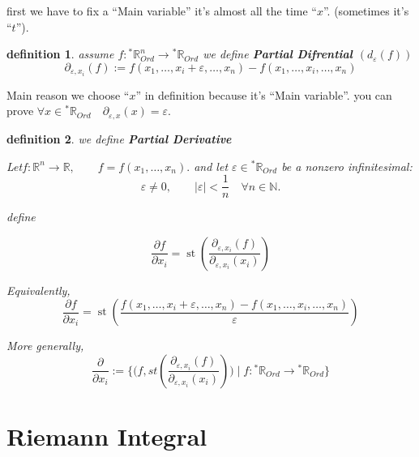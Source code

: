 \documentclass[10pt,a4paper]{book}
\newtheorem{definition}{definition}[section]
\begin{document}
first we have to fix a ``Main variable'' it's almost all the time ``$x$''.
(sometimes it's ``$t$'').
\begin{definition} assume $f : {}^*\mathbb{R}_{Ord}^n  \to {}^*\mathbb{R}_{Ord}$
    we define \textbf{Partial Difrential $(d_\varepsilon(f))$}
    \[ \partial_{\varepsilon , x_i } (f) := f(x_1,\ldots,x_i+ \varepsilon ,\ldots,x_n) - f(x_1,\ldots,x_i,\ldots,x_n) \]
\end{definition}

Main reason we choose ``$x$'' in definition because it's ``Main variable''. you
can prove $\forall x \in {}^*\mathbb{R}_{Ord} \quad \partial_{\varepsilon , x
    }(x) = \varepsilon$.

\begin{definition} we define \textbf{Partial Derivative}

    Let$f:\mathbb{R}^n\to\mathbb{R}, \qquad f=f(x_1,\ldots,x_n).$ and let \(
    \varepsilon \in{}^*\mathbb{R}_{Ord}\) be a nonzero infinitesimal:
    \[
        \varepsilon \neq 0,
        \qquad
        | \varepsilon |<\frac{1}{n}
        \quad\forall n\in\mathbb{N}.
    \]

    define

    \[
        \frac{\partial f}{\partial x_i}
        =
        \operatorname{st}
        \left(
        \frac{\partial_{\varepsilon , x_i }(f)}{\partial_{\varepsilon , x_i }(x_i)}
        \right)
    \]

    Equivalently,
    \[
        \frac{\partial f}{\partial x_i}
        =
        \operatorname{st}
        \left(
        \frac{
            f(x_1,\ldots,x_i+ \varepsilon ,\ldots,x_n)
            -
            f(x_1,\ldots,x_i,\ldots,x_n)
        }{ \varepsilon }
        \right)
    \]

    More generally,
    \[ \frac{ \partial }{\partial x_i }  :=  \{ \big(f , st(\frac{\partial_{\varepsilon , x_i }(f)}{\partial_{\varepsilon , x_i }(x_i)}) \big) \mid f : {}^*\mathbb{R}_{Ord} \to {}^*\mathbb{R}_{Ord} \} \]
\end{definition}

\section{Riemann Integral}
\end{document}
